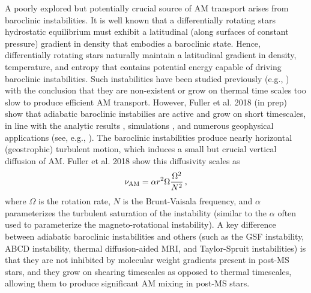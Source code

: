 A poorly explored but potentially crucial source of AM transport arises from baroclinic instabilities. It is well known that a differentially rotating stars hydrostatic equilibrium must exhibit a latitudinal (along surfaces of constant pressure) gradient in density that embodies a baroclinic state. Hence, differentially rotating stars naturally maintain a latitudinal gradient in density, temperature, and entropy that contains potential energy capable of driving baroclinic instabilities. Such instabilities have been studied previously (e.g., \citealt{goldreich:67,knobloch:82,knobloch:83,spruit:83,spruit:84,zahn:93}) with the conclusion that they are non-existent or grow on thermal time scales too slow to produce efficient AM transport. However, Fuller et al. 2018 (in prep) show that adiabatic baroclinic instabilies are active and grow on short timescales, in line with the analytic results \citep{tassoul:82,fujimoto:87,fujimoto:88}, simulations \cite{simitev:17}, and numerous geophysical applications (see, e.g., \citealt{pedlosky:92}). The baroclinic instabilities produce nearly horizontal (geostrophic) turbulent motion, which induces a small but crucial vertical diffusion of AM. Fuller et al. 2018 show this diffusivity scales as
\begin{equation}
\label{numri} 
\nu_{\rm AM} = \alpha r^2 \Omega \frac{\Omega^2}{N^2} \, ,
\end{equation}
where $\Omega$ is the rotation rate, $N$ is the Brunt-Vaisala frequency, and $\alpha$ parameterizes the turbulent saturation of the instability (similar to the $\alpha$ often used to parameterize the magneto-rotational instability). A key difference between adiabatic baroclinic instabilities and others (such as the GSF instability, ABCD instability, thermal diffusion-aided MRI, and Taylor-Spruit instabilities) is that they are not inhibited by molecular weight gradients present in post-MS stars, and they grow on shearing timescales as opposed to thermal timescales, allowing them to produce significant AM mixing in post-MS stars.





